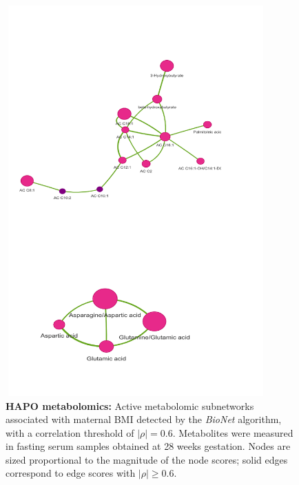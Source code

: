 	\begin{figure}[!hbt]
				
				\centering
				
				
				\includegraphics[height=15cm,width=10cm]{dd_corr06_2clusters.png}
				
				
				\caption{{\bf HAPO metabolomics:} Active metabolomic subnetworks associated with maternal BMI detected by the {\it BioNet} algorithm, with a correlation threshold of $|\rho|=0.6$. Metabolites were measured in fasting serum samples obtained at 28 weeks gestation. Nodes are sized proportional to the magnitude of the node scores; solid edges correspond to edge scores with $|\rho| \ge 0.6$.}
				\label{plotmod15}
			\end{figure}
